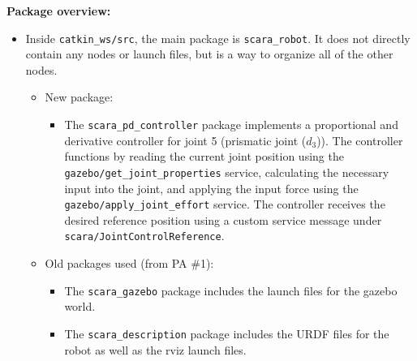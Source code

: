 \documentclass[10pt]{article}
\begin{document}
\setlength{\abovedisplayskip}{6pt}
\setlength{\belowdisplayskip}{3pt}
\setlength{\abovedisplayshortskip}{4pt}
\setlength{\belowdisplayshortskip}{4pt}

\textbf{Package overview:}
\begin{itemize}
	\item Inside \texttt{catkin\_ws/src}, the main package is \texttt{scara\_robot}. It does not directly contain any nodes or launch files, but is a way to organize all of the other nodes.
	\begin{itemize}
		\item New package:
		\begin{itemize}
			\item The \texttt{scara\_pd\_controller} package implements a proportional and derivative controller for joint 5 (prismatic joint ($d_3$)). The controller functions by reading the current joint position using the \\ \texttt{gazebo/get\_joint\_properties} service, calculating the necessary input into the joint, and applying the input force using the \texttt{gazebo/apply\_joint\_effort} service. The controller receives the desired reference position using a custom service message under \texttt{scara/JointControlReference}.
		\end{itemize}
		
		\item Old packages used (from PA \#1):
		\begin{itemize}
			\item The \texttt{scara\_gazebo} package includes the launch files for the gazebo world.
			\item The \texttt{scara\_description} package includes the URDF files for the robot as well as the rviz launch files.
		\end{itemize}
	\end{itemize}
\end{itemize}
\vspace{0.5cm}
\end{document}
